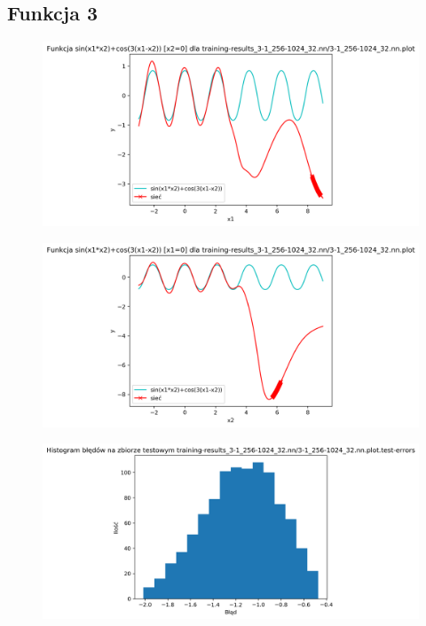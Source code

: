 \documentclass{classrep}
\begin{document}
{        \subsection{Funkcja 3}
        {
            \begin{figure}[!htbp]
                \centering
                \includegraphics[width=135mm]{wykresy/3-1_256-1024_32_nn_plot1.png}
            \end{figure}
            \begin{figure}[!htbp]
                \centering
                \includegraphics[width=135mm]{wykresy/3-1_256-1024_32_nn_plot2.png}
            \end{figure}
            \begin{figure}[!htbp]
                \centering
                \includegraphics[width=145mm]{wykresy/3-1_256-1024_32_nn_plot_test-errors.png}

\end{figure}}}
\end{document}
